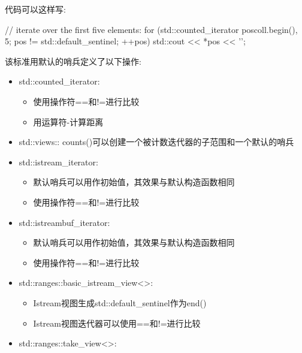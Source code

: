 代码可以这样写:

\begin{cpp}
// iterate over the first five elements:
for (std::counted_iterator pos{coll.begin(), 5};
pos != std::default_sentinel;
++pos) {
	std::cout << *pos << '\n';
}
\end{cpp}

该标准用默认的哨兵定义了以下操作:

\begin{itemize}
\item
std::counted\_iterator:

\begin{itemize}
\item
使用操作符==和!=进行比较

\item
用运算符-计算距离
\end{itemize}

\item
std::views:: counts()可以创建一个被计数迭代器的子范围和一个默认的哨兵

\item
std::istream\_iterator:

\begin{itemize}
\item
默认哨兵可以用作初始值，其效果与默认构造函数相同

\item
使用操作符==和!=进行比较
\end{itemize}

\item
std::istreambuf\_iterator:

\begin{itemize}
\item
默认哨兵可以用作初始值，其效果与默认构造函数相同

\item
使用操作符==和!=进行比较
\end{itemize}

\item
std::ranges::basic\_istream\_view<>:

\begin{itemize}
\item
Istream视图生成std::default\_sentinel作为end()

\item
Istream视图迭代器可以使用==和!=进行比较
\end{itemize}

\item
std::ranges::take\_view<>:


\end{itemize}
